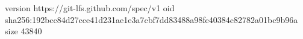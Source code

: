 version https://git-lfs.github.com/spec/v1
oid sha256:192bcc84d27cce41d231ae1e3a7cbf7dd83488a98fe40384c82782a01bc9b96a
size 43840
